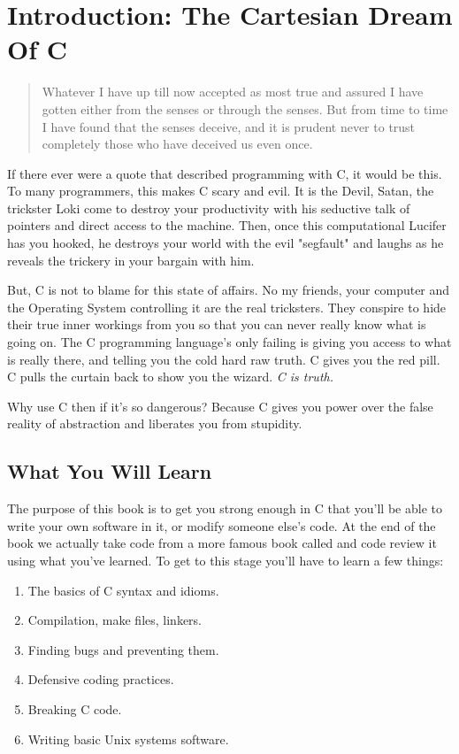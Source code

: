 \chapter{Introduction: The Cartesian Dream Of C}

\begin{quotation}

Whatever I have up till now accepted as most true and assured I have gotten
either from the senses or through the senses. But from time to time I have
found that the senses deceive, and it is prudent never to trust completely
those who have deceived us even once.

\end{quotation}

If there ever were a quote that described programming with C, it would be this.
To many programmers, this makes C scary and evil.  It is the Devil, Satan, the
trickster Loki come to destroy your productivity with his seductive talk of
pointers and direct access to the machine.  Then, once this computational
Lucifer has you hooked, he destroys your world with the evil "segfault" and
laughs as he reveals the trickery in your bargain with him.

But, C is not to blame for this state of affairs.  No my friends, your computer
and the Operating System controlling it are the real tricksters.  They conspire
to hide their true inner workings from you so that you can never really know
what is going on.  The C programming language's only failing is giving you
access to what is really there, and telling you the cold hard raw truth.  C
gives you the red pill.  C pulls the curtain back to show you the wizard.
\emph{C is truth.}

Why use C then if it's so dangerous?   Because C gives you power over the false
reality of abstraction and liberates you from stupidity.


\section{What You Will Learn}

The purpose of this book is to get you strong enough in C
that you'll be able to write your own software in it, or modify
someone else's code.  At the end of the book we actually take
code from a more famous book called \krc and code review it
using what you've learned.  To get to this stage you'll have to
learn a few things:

\begin{enumerate}
\item The basics of C syntax and idioms.
\item Compilation, make files, linkers.
\item Finding bugs and preventing them.
\item Defensive coding practices.
\item Breaking C code.
\item Writing basic Unix systems software.
\end{enumerate}

